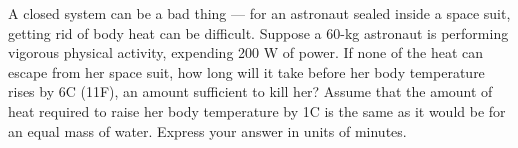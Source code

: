         A closed system can be a bad thing --- for an astronaut
        sealed inside a space suit, getting rid of body heat can be
        difficult. Suppose a 60-kg astronaut is performing vigorous
        physical activity, expending 200 W of power. If none of the
        heat can escape from her space suit, how long will it take
        before her body temperature rises by 6\degunit{}C (11\degunit{}F), an amount 
        sufficient to kill her?  Assume that the amount of heat
        required to raise her body temperature by 1\degunit{}C is the same as
        it would be for an equal mass of water. Express your answer
        in units of minutes. \answercheck
